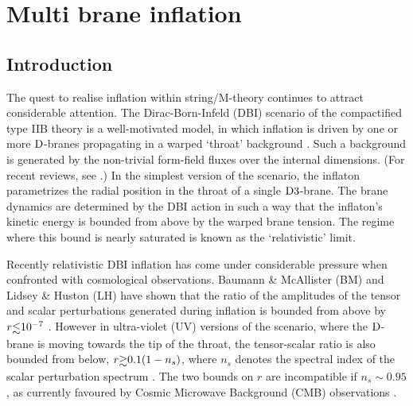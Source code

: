 \renewcommand{\CVSrevision}{\version$Id: multibrane.tex,v 1.4 2009/07/14 16:58:03 ith Exp $}

\chapter{Multi brane inflation}
\label{ch:multibrane}


\section{Introduction}

The quest to realise inflation within string/M-theory continues to 
attract considerable attention. The Dirac-Born-Infeld (DBI) scenario 
of the compactified type IIB theory is a well-motivated model, 
in which inflation is driven by one or more ${\rm D}$-branes 
propagating in a warped `throat' background
\cite{brane1,brane11,brane12,brane13,brane2,brane20,brane3,brane4,brane5,brane6}
. Such a background is generated 
by the non-trivial form-field fluxes over the internal dimensions. 
(For recent reviews, see
\cite{tyereview,McAllister:2007bg,Lorenz:2007ze,Kallosh:2007wm,Bean:2007eh,bean,
cline}.) 
In the simplest version of the scenario, 
the inflaton parametrizes the radial 
position in the throat of a single ${\rm D3}$-brane. 
The brane dynamics are determined by the DBI action in such a 
way that the inflaton's kinetic energy is bounded from above by the warped 
brane tension. The regime where this bound is nearly saturated is 
known as the `relativistic' limit.

Recently relativistic DBI inflation has come under considerable 
pressure when confronted with cosmological observations.  
Baumann \& McAllister (BM) and Lidsey \& Huston (LH) 
have shown that the ratio of the amplitudes of the 
tensor and scalar perturbations generated during 
inflation is bounded from above by $r \lsim 10^{-7}$
\cite{bmpaper,lidseyhuston}. 
However in ultra-violet (UV) versions of the scenario, where 
the ${\rm D}$-brane is moving towards the tip of the throat, the tensor-scalar 
ratio is also bounded from below, $r \gsim 0.1 (1-n_s)$, 
where $n_s$ denotes the spectral index 
of the scalar perturbation spectrum \cite{lidseyhuston}. 
The two bounds on $r$ are incompatible 
if $n_s \sim 0.95$, as currently favoured by Cosmic Microwave Background 
(CMB) observations \cite{spergel,Komatsu:2008hk}. 

